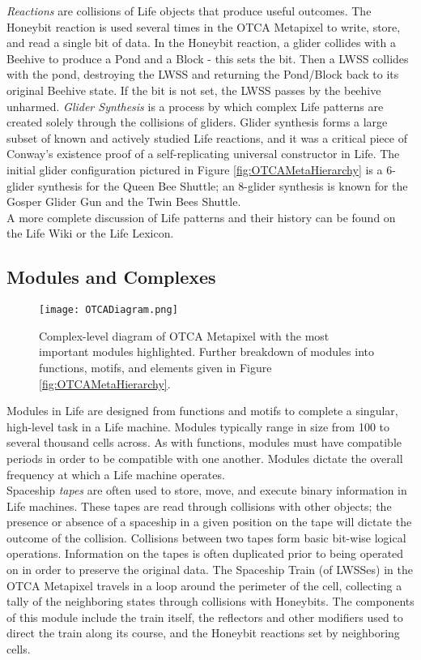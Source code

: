 {\textit{Reactions} are collisions of Life objects that produce useful outcomes.  The Honeybit reaction is used several times in the OTCA Metapixel to write, store, and read a single bit of data.  In the Honeybit reaction, a glider collides with a Beehive to produce a Pond and a Block - this sets the bit.  Then a LWSS collides with the pond, destroying the LWSS and returning the Pond/Block back to its original Beehive state.  If the bit is not set, the LWSS passes by the beehive unharmed.  \textit{Glider Synthesis} is a process by which complex Life patterns are created solely through the collisions of gliders.  Glider synthesis forms a large subset of known and actively studied Life reactions, and it was a critical piece of Conway's existence proof of a self-replicating universal constructor in Life.  The initial glider configuration pictured in Figure \ref{fig:OTCAMetaHierarchy} is a 6-glider synthesis for the Queen Bee Shuttle; an 8-glider synthesis is known for the Gosper Glider Gun and the Twin Bees Shuttle.\\

A more complete discussion of Life patterns and their history can be found on the Life Wiki\cite{Authors2016} or the Life Lexicon\cite{Silver2016}.

\subsection{Modules and Complexes}

\begin{figure}
  \texttt{[image: OTCADiagram.png]}
  \caption{Complex-level diagram of OTCA Metapixel with the most important modules highlighted.  Further breakdown of modules into functions, motifs, and elements given in Figure \ref{fig:OTCAMetaHierarchy}.}
  \label{fig:OTCADiagram}
\end{figure}

Modules in Life are designed from functions and motifs to complete a singular, high-level task in a Life machine.  Modules typically range in size from 100 to several thousand cells across.  As with functions, modules must have compatible periods in order to be compatible with one another.  Modules dictate the overall frequency at which a Life machine operates.\\

Spaceship \textit{tapes} are often used to store, move, and execute binary information in Life machines.  These tapes are read through collisions with other objects; the presence or absence of a spaceship in a given position on the tape will dictate the outcome of the collision.  Collisions between two tapes form basic bit-wise logical operations.  Information on the tapes is often duplicated prior to being operated on in order to preserve the original data.  The Spaceship Train (of LWSSes) in the OTCA Metapixel travels in a loop around the perimeter of the cell, collecting a tally of the neighboring states through collisions with Honeybits.  The components of this module include the train itself, the reflectors and other modifiers used to direct the train along its course, and the Honeybit reactions set by neighboring cells.\\

}

